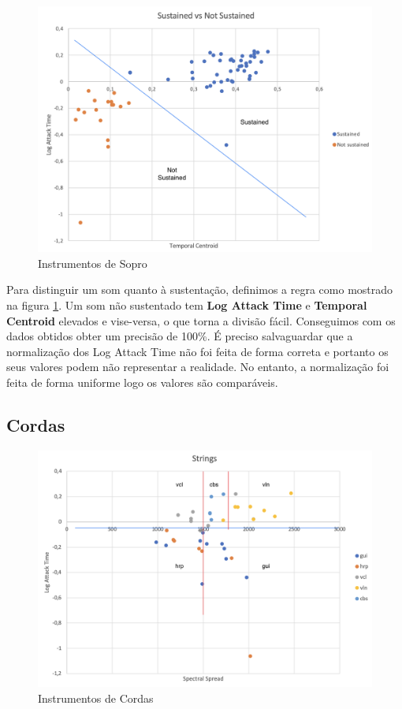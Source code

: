 \begin{figure}[H]
    \centering
    \includegraphics[width=.8\linewidth]{figs/comp_4.png}
    \caption{Instrumentos de Sopro}
    \label{fig:10}
\end{figure}

Para distinguir um som quanto à sustentação, definimos a regra como mostrado na figura \ref{fig:10}.
Um som não sustentado tem \textbf{Log Attack Time} e \textbf{Temporal Centroid} elevados e vise-versa, o que torna a divisão fácil.
Conseguimos com os dados obtidos obter um precisão de 100\%.
É preciso salvaguardar que a normalização dos Log Attack Time não foi feita de forma correta e portanto os seus valores podem não representar a realidade.
No entanto, a normalização foi feita de forma uniforme logo os valores são comparáveis.

\subsection{Cordas}

\begin{figure}[H]
    \centering
    \includegraphics[width=.8\linewidth]{figs/comp_2.png}
    \caption{Instrumentos de Cordas}
    \label{fig:8}
\end{figure}

